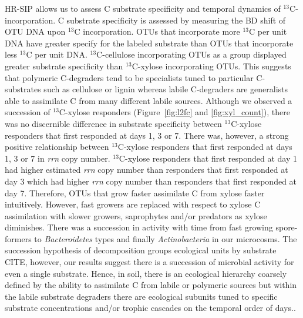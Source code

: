HR-SIP allows us to assess C substrate specificity and temporal dynamics of
$^{13}$C-incorporation. C substrate specificity is assessed by measuring the BD
shift of OTU DNA upon $^{13}$C incorporation. OTUs that incorporate more
$^{13}$C per unit DNA have greater specify for the labeled substrate than OTUs
that incorporate less $^{13}$C per unit DNA. $^{13}$C-cellulose incorporating
OTUs as a group displayed greater substrate specificity than $^{13}$C-xylose
incorporating OTUs. This suggests that polymeric C-degraders tend to be
specialists tuned to particular C-substrates such as cellulose or lignin
whereas labile C-degraders are generalists able to assimilate C from many
different labile sources. Although we observed a succession of $^{13}$C-xylose
responders (Figure~\ref{fig:l2fc} and \ref{fig:xyl_count}), there was no
discernible difference in substrate specificity between $^{13}$C-xylose
responders that first responded at days 1, 3 or 7. There was, however, a strong
positive relationship between $^{13}$C-xylose responders that first responded
at days 1, 3 or 7 in \textit{rrn} copy number. $^{13}$C-xylose responders that
first responded at day 1 had higher estimated \textit{rrn} copy number than
responders that first responded at day 3 which had higher \textit{rrn} copy
number than responders that first responded at day 7.  Therefore, OTUs that
grow faster assimilate C from xylose faster intuitively.  However, fast growers
are replaced with respect to xylose C assimilation with slower growers, saprophytes
and/or predators as xylose diminishes. There was a succession in activity
with time from fast growing spore-formers to \textit{Bacteroidetes} types and
finally \textit{Actinobacteria} in our microcosms. The succession hypothesis of
decomposition groups ecological units by substrate CITE, however, our results
suggest there is a succession of microbial activity for even a single
substrate. Hence, in soil, there is an ecological hierarchy coarsely defined by
the ability to assimilate C from labile or polymeric sources but within the
labile substrate degraders there are ecological subunits tuned to specific
substrate concentrations and/or trophic cascades on the temporal order of
days..

